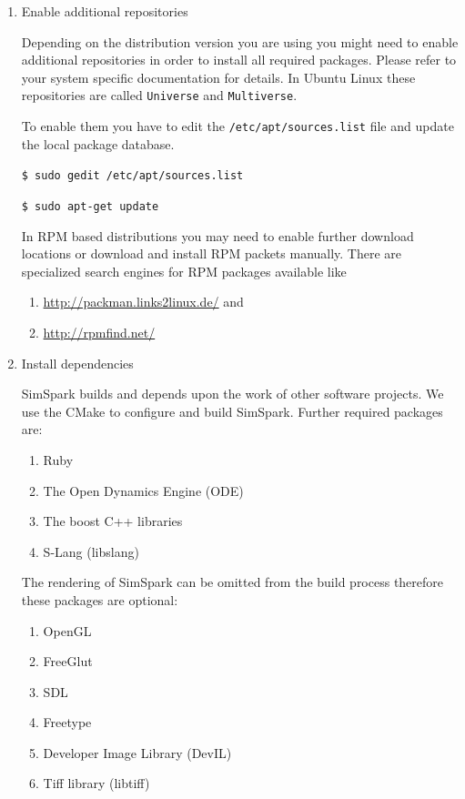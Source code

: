 \begin{enumerate}

\item Enable additional repositories

Depending on the distribution version you are using you might need to
enable additional repositories in order to install all required
packages. Please refer to your system specific documentation for
details. In Ubuntu Linux these repositories are called
\texttt{Universe} and \texttt{Multiverse}.

To enable them you have to edit the \texttt{/etc/apt/sources.list}
file and update the local package database.

\texttt{\$ sudo gedit /etc/apt/sources.list}


\texttt{\$ sudo apt-get update}


In RPM based distributions you may need to enable further download
locations or download and install RPM packets manually. There are
specialized search engines for RPM packages available like 

\begin{enumerate}
\item\url{http://packman.links2linux.de/} and
\item\url{http://rpmfind.net/}
\end{enumerate}

\item Install dependencies

SimSpark builds and depends upon the work of other software
projects. We use the CMake to configure and build
SimSpark.
Further required packages are:

\begin{enumerate}
\item Ruby
\item The Open Dynamics Engine (ODE)
\item The boost C++ libraries
\item S-Lang (libslang)
\end{enumerate}

The rendering of SimSpark can be omitted from the build process
therefore these packages are optional:

\begin{enumerate}
\item OpenGL
\item FreeGlut
\item SDL
\item Freetype
\item Developer Image Library (DevIL)
\item Tiff library (libtiff)
\end{enumerate}


\end{enumerate}
